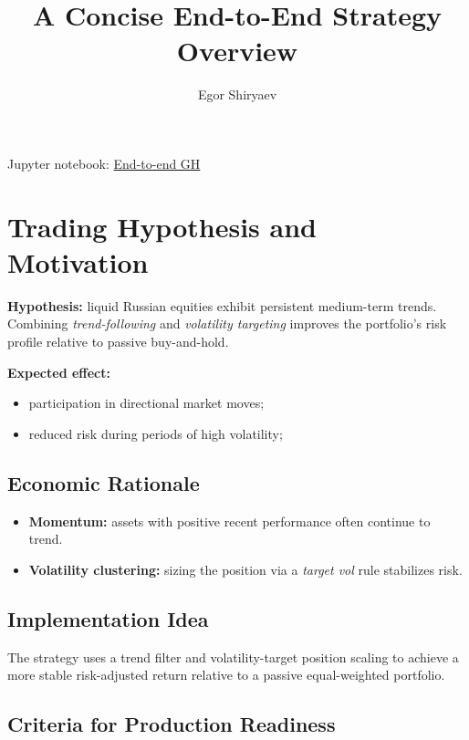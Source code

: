\documentclass[12pt]{article}
\title{A Concise End-to-End Strategy Overview}
\author{Egor Shiryaev}
\date{}
\begin{document}
\maketitle

\noindent Jupyter notebook: \href{https://github.com/tenzenmonsta/End-to-end-quant-strategy}{End-to-end GH}

\section{Trading Hypothesis and Motivation}
\textbf{Hypothesis:} liquid Russian equities exhibit persistent medium-term trends.
Combining \textit{trend-following} and \textit{volatility targeting} improves the portfolio's risk profile relative to passive buy-and-hold.

\medskip
\textbf{Expected effect:}
\begin{itemize}
    \item participation in directional market moves;
    \item reduced risk during periods of high volatility;
\end{itemize}

\subsection*{Economic Rationale}
\begin{itemize}
    \item \textbf{Momentum:} assets with positive recent performance often continue to trend.
    \item \textbf{Volatility clustering:} sizing the position via a \textit{target vol} rule stabilizes risk.
\end{itemize}

\subsection*{Implementation Idea}
The strategy uses a trend filter and volatility-target position scaling to achieve a more stable risk-adjusted return relative to a passive equal-weighted portfolio.


\subsection*{Criteria for Production Readiness}
\end{document}
